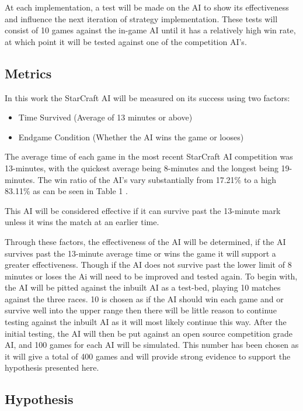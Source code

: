\documentclass[journal]{IEEEtran}
\begin{document}
At each implementation, a test will be made on the AI to show its effectiveness and influence the next iteration of strategy implementation. These tests will consist of 10 games against the in-game AI until it has a relatively high win rate, at which point it will be tested against one of the competition AI's.


\subsection{Metrics}
In this work the StarCraft AI will be measured on its success using two factors:
\begin{itemize}
\item Time Survived (Average of 13 minutes or above)
\item Endgame Condition (Whether the AI wins the game or looses)
\end{itemize}

The average time of each game in the most recent StarCraft AI competition was 13-minutes, with the quickest average being 8-minutes and the longest being 19-minutes. The win ratio of the AI's vary substantially from 17.21\% to a high 83.11\% as can be seen in Table 1 \cite{Results}. 

This AI will be considered effective if it can survive past the 13-minute mark unless it wins the match at an earlier time.

Through these factors, the effectiveness of the AI will be determined, if the AI survives past the 13-minute average time or wins the game it will support a greater effectiveness. Though if the AI does not survive past the lower limit of 8 minutes or loses the Ai will need to be improved and tested again. 
To begin with, the AI will be pitted against the inbuilt AI as a test-bed, playing 10 matches against the three races. 10 is chosen as if the AI should win each game and or survive well into the upper range then there will be little reason to continue testing against the inbuilt AI as it will most likely continue this way. After the initial testing, the AI will then be put against an open source competition grade AI, and 100 games for each AI will be simulated. This number has been chosen as it will give a total of 400 games and will provide strong evidence to support the hypothesis presented here.

\subsection{Hypothesis}
\end{document}
